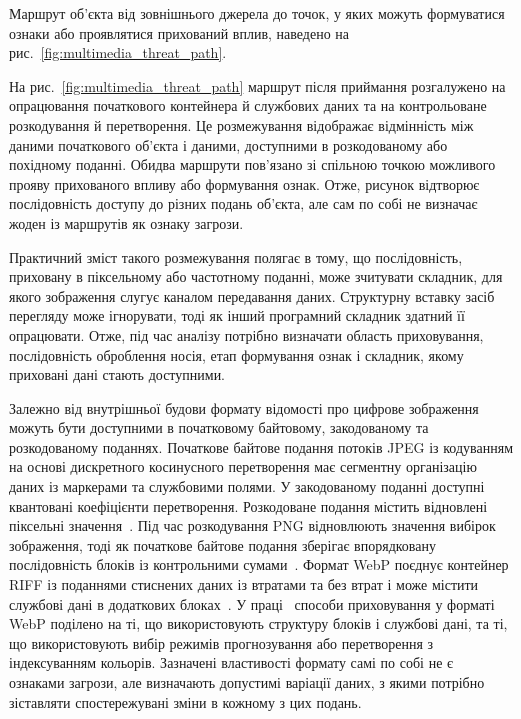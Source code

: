 Маршрут об’єкта від зовнішнього джерела до точок, у яких можуть формуватися ознаки або проявлятися прихований вплив, наведено на рис.~\ref{fig:multimedia_threat_path}.



\vspace{-1.0\baselineskip}

На рис.~\ref{fig:multimedia_threat_path} маршрут після приймання розгалужено на опрацювання початкового контейнера й службових даних та на контрольоване розкодування й перетворення. Це розмежування відображає відмінність між даними початкового об’єкта і даними, доступними в розкодованому або похідному поданні. Обидва маршрути пов’язано зі спільною точкою можливого прояву прихованого впливу або формування ознак. Отже, рисунок відтворює послідовність доступу до різних подань об’єкта, але сам по собі не визначає жоден із маршрутів як ознаку загрози.

Практичний зміст такого розмежування полягає в тому, що послідовність, приховану в піксельному або частотному поданні, може зчитувати складник, для якого зображення слугує каналом передавання даних. Структурну вставку засіб перегляду може ігнорувати, тоді як інший програмний складник здатний її опрацювати. Отже, під час аналізу потрібно визначати область приховування, послідовність оброблення носія, етап формування ознак і складник, якому приховані дані стають доступними.

Залежно від внутрішньої будови формату відомості про цифрове зображення можуть бути доступними в початковому байтовому, закодованому та розкодованому поданнях. Початкове байтове подання потоків JPEG із кодуванням на основі дискретного косинусного перетворення має сегментну організацію даних із маркерами та службовими полями. У закодованому поданні доступні квантовані коефіцієнти перетворення. Розкодоване подання містить відновлені піксельні значення~\cite{itu1992jpeg}. Під час розкодування PNG відновлюють значення вибірок зображення, тоді як початкове байтове подання зберігає впорядковану послідовність блоків із контрольними сумами~\cite{w3c2025png}. Формат WebP поєднує контейнер RIFF із поданнями стиснених даних із втратами та без втрат і може містити службові дані в додаткових блоках~\cite{google2025webp}. У праці~\cite{koptyra2023webp} способи приховування у форматі WebP поділено на ті, що використовують структуру блоків і службові дані, та ті, що використовують вибір режимів прогнозування або перетворення з індексуванням кольорів. Зазначені властивості формату самі по собі не є ознаками загрози, але визначають допустимі варіації даних, з якими потрібно зіставляти спостережувані зміни в кожному з цих подань.

